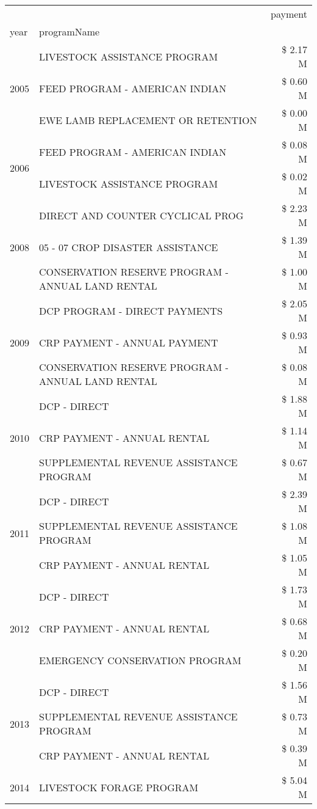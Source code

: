 \begin{tabular}{llr}
\toprule
 &  & payment \\
year & programName &  \\
\midrule
\multirow[t]{3}{*}{2005} & LIVESTOCK ASSISTANCE PROGRAM & \$ 2.17 M \\
 & FEED PROGRAM - AMERICAN INDIAN & \$ 0.60 M \\
 & EWE LAMB REPLACEMENT OR RETENTION & \$ 0.00 M \\
\cline{1-3}
\multirow[t]{2}{*}{2006} & FEED PROGRAM - AMERICAN INDIAN & \$ 0.08 M \\
 & LIVESTOCK ASSISTANCE PROGRAM & \$ 0.02 M \\
\cline{1-3}
\multirow[t]{3}{*}{2008} & DIRECT AND COUNTER CYCLICAL PROG & \$ 2.23 M \\
 & 05 - 07 CROP DISASTER ASSISTANCE & \$ 1.39 M \\
 & CONSERVATION RESERVE PROGRAM - ANNUAL LAND RENTAL & \$ 1.00 M \\
\cline{1-3}
\multirow[t]{3}{*}{2009} & DCP PROGRAM - DIRECT PAYMENTS & \$ 2.05 M \\
 & CRP PAYMENT - ANNUAL PAYMENT & \$ 0.93 M \\
 & CONSERVATION RESERVE PROGRAM - ANNUAL LAND RENTAL & \$ 0.08 M \\
\cline{1-3}
\multirow[t]{3}{*}{2010} & DCP - DIRECT & \$ 1.88 M \\
 & CRP PAYMENT - ANNUAL RENTAL & \$ 1.14 M \\
 & SUPPLEMENTAL REVENUE ASSISTANCE PROGRAM & \$ 0.67 M \\
\cline{1-3}
\multirow[t]{3}{*}{2011} & DCP - DIRECT & \$ 2.39 M \\
 & SUPPLEMENTAL REVENUE ASSISTANCE PROGRAM & \$ 1.08 M \\
 & CRP PAYMENT - ANNUAL RENTAL & \$ 1.05 M \\
\cline{1-3}
\multirow[t]{3}{*}{2012} & DCP - DIRECT & \$ 1.73 M \\
 & CRP PAYMENT - ANNUAL RENTAL & \$ 0.68 M \\
 & EMERGENCY CONSERVATION PROGRAM & \$ 0.20 M \\
\cline{1-3}
\multirow[t]{3}{*}{2013} & DCP - DIRECT & \$ 1.56 M \\
 & SUPPLEMENTAL REVENUE ASSISTANCE PROGRAM & \$ 0.73 M \\
 & CRP PAYMENT - ANNUAL RENTAL & \$ 0.39 M \\
\cline{1-3}
\multirow[t]{3}{*}{2014} & LIVESTOCK FORAGE PROGRAM & \$ 5.04 M \\

\end{tabular}
